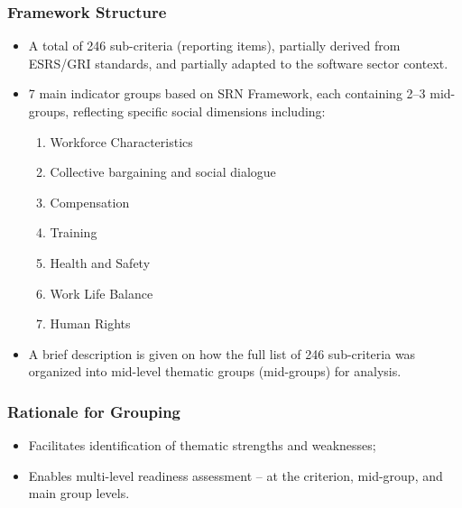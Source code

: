 \subsubsection{Framework Structure}
\begin{itemize}
    \item A total of 246 sub-criteria (reporting items), partially derived from ESRS/GRI standards, and partially adapted to the 
    software sector context.
    \item 7 main indicator groups based on SRN Framework, each containing 2--3 mid-groups, reflecting specific social dimensions including:
    \begin{enumerate}
        \item Workforce Characteristics
        \item Collective bargaining and social dialogue
        \item Compensation
        \item Training
        \item Health and Safety
        \item Work Life Balance
        \item Human Rights
    \end{enumerate}
    \item A brief description is given on 
    how the full list of 246 sub-criteria was organized into mid-level thematic groups (mid-groups) for analysis. 
\end{itemize}

\subsubsection{Rationale for Grouping}
\begin{itemize}
    \item Facilitates identification of thematic strengths and weaknesses;
    \item Enables multi-level readiness assessment -- at the criterion, mid-group, and main group levels.
\end{itemize}

